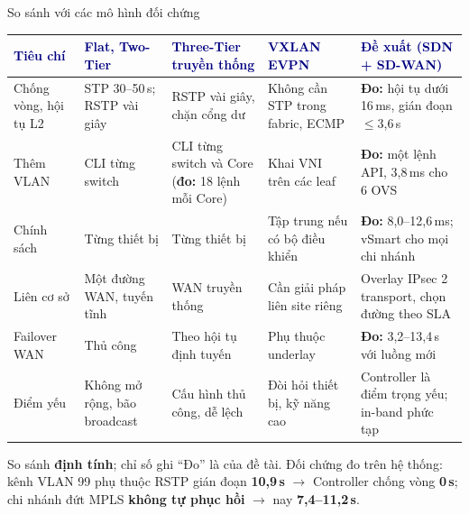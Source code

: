 \documentclass[aspectratio=169, 10pt, xcolor={table}]{beamer}
\renewcommand{\arraystretch}{1.25}
\newcommand{\hd}[1]{\textcolor{navy}{\textbf{#1}}}
\begin{document}
\begin{frame}{So sánh với các mô hình đối chứng}
    \vspace{0.05cm}
    \scriptsize
    \renewcommand{\arraystretch}{1.08}
    \begin{tabularx}{\textwidth}{@{}L{0.13\textwidth}L{0.17\textwidth}L{0.19\textwidth}L{0.19\textwidth}Y@{}}
        \toprule
        \hd{Tiêu chí} & \hd{Flat, Two-Tier} & \hd{Three-Tier truyền thống} & \hd{VXLAN EVPN} & \hd{\color{brand}Đề xuất (SDN + SD-WAN)} \\
        \midrule
        Chống vòng, hội tụ L2 & STP 30--50\,s; RSTP vài giây & RSTP vài giây, chặn cổng dư & Không cần STP trong fabric, ECMP & \textbf{Đo:} hội tụ dưới 16\,ms, gián đoạn $\le$3,6\,s \\
        Thêm VLAN & CLI từng switch & CLI từng switch và Core (\textbf{đo:} 18 lệnh mỗi Core) & Khai VNI trên các leaf & \textbf{Đo:} một lệnh API, 3,8\,ms cho 6 OVS \\
        Chính sách & Từng thiết bị & Từng thiết bị & Tập trung nếu có bộ điều khiển & \textbf{Đo:} 8,0--12,6\,ms; vSmart cho mọi chi nhánh \\
        Liên cơ sở & Một đường WAN, tuyến tĩnh & WAN truyền thống & Cần giải pháp liên site riêng & Overlay IPsec 2 transport, chọn đường theo SLA \\
        Failover WAN & Thủ công & Theo hội tụ định tuyến & Phụ thuộc underlay & \textbf{Đo:} 3,2--13,4\,s với luồng mới \\
        Điểm yếu & Không mở rộng, bão broadcast & Cấu hình thủ công, dễ lệch & Đòi hỏi thiết bị, kỹ năng cao & Controller là điểm trọng yếu; in-band phức tạp \\
        \bottomrule
    \end{tabularx}
    \vspace{0.08cm}
    \begin{softcard}\scriptsize
        So sánh \textbf{định tính}; chỉ số ghi ``Đo'' là của đề tài. Đối chứng đo trên hệ thống:
        kênh VLAN 99 phụ thuộc RSTP gián đoạn \textbf{10,9\,s} $\rightarrow$ Controller chống vòng \textbf{0\,s};
        chi nhánh đứt MPLS \textbf{không tự phục hồi} $\rightarrow$ nay \textbf{7,4--11,2\,s}.
    \end{softcard}
\end{frame}
\end{document}

